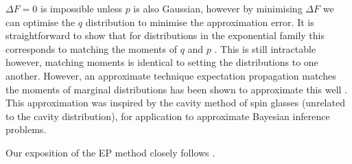 \documentclass[11pt,twoside]{report}
\begin{document}
$\Delta F = 0$ is impossible unless $p$ is also Gaussian, however by minimising $\Delta F$ we can optimise the $q$ distribution to minimise the approximation error.
It is straightforward to show that for distributions in the exponential family this corresponds to matching the moments of $q$ and $p$ \cite{Minka2001a,Minka2001b,Rasmussen2006,Cunningham2011}.
This is still intractable however, matching moments is identical to setting the distributions to one another.
However, an approximate technique expectation propagation matches the moments of marginal distributions has been shown to approximate this well \cite{minka2001a,Minka2001b,Minka2004,Rasmussen2006,Cunningham2011}.
This approximation was inspired by the cavity method of spin glasses (unrelated to the cavity distribution), for application to approximate Bayesian inference problems.

Our exposition of the EP method closely follows \cite{Cunningham2011}.
\end{document}
